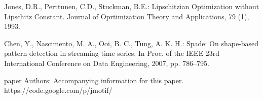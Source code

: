 \documentclass{llncs}
\begin{document}
\begin{thebibliography}{5}
Jones, D.R., Perttunen, C.D., Stuckman, B.E.:
Lipschitzian Optimization without Lipschitz Constant.
Journal of Oprtimization Theory and Applications, 79 (1), 1993.

Chen, Y., Nascimento, M. A., Ooi, B. C., Tung, A. K. H.:
Spade: On shape-based pattern detection in streaming time series. 
In Proc. of the IEEE 23rd International Conference on Data Engineering, 2007, pp. 786–795.

paper Authors: 
Accompanying information for this paper. 
https://code.google.com/p/jmotif/

\end{thebibliography}

%
\end{document}
